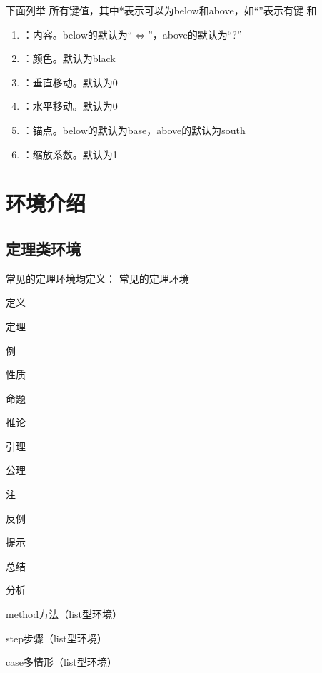 \documentclass{xdyy-usermanual}
\begin{document}
下面列举  所有键值，其中*表示可以为below和above，如“”表示有键  和 
\begin{enumerate}
  \item {}：内容。below的默认为“$\Longleftrightarrow$”，above的默认为“?”
  \item {}：颜色。默认为black
  \item {}：垂直移动。默认为0
  \item {}：水平移动。默认为0
  \item {}：锚点。below的默认为base，above的默认为south
  \item {}：缩放系数。默认为1
\end{enumerate}



\section{环境介绍}


\subsection{定理类环境}

常见的定理环境均定义：
常见的定理环境
  \begin{xchoices}[label-style = arabic]
    \item 定义
    \item 定理
    \item 例
    \item 性质
    \item 命题
    \item 推论
    \item 引理
    \item 公理
    \item 注
    \item 反例
    \item 提示
    \item 总结
    \item 分析
    \item method方法（list型环境）
    \item step步骤（list型环境）
    \item case多情形（list型环境）
  \end{xchoices}
\end{document}
